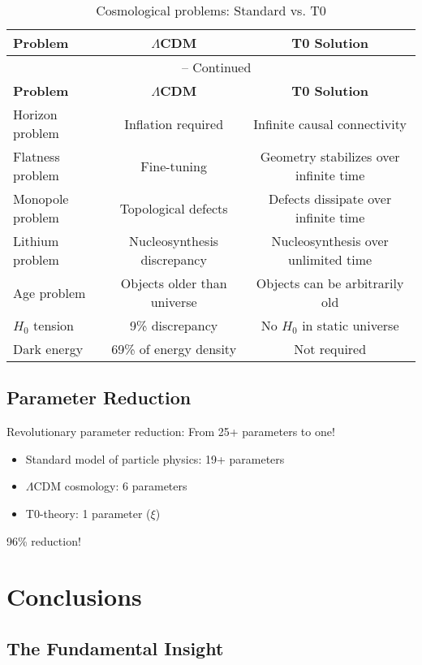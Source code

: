 \documentclass[12pt,a4paper]{article}
\begin{document}
	\begin{longtable}{lcc}
		\caption{Cosmological problems: Standard vs. T0} \\
		\toprule
		\textbf{Problem} & \textbf{$\Lambda$CDM} & \textbf{T0 Solution} \\
		\midrule
		\endfirsthead
		\multicolumn{3}{c}{\tablename\ \thetable{} -- Continued} \\
		\toprule
		\textbf{Problem} & \textbf{$\Lambda$CDM} & \textbf{T0 Solution} \\
		\midrule
		\endhead
		Horizon problem & Inflation required & Infinite causal connectivity \\
		Flatness problem & Fine-tuning & Geometry stabilizes over infinite time \\
		Monopole problem & Topological defects & Defects dissipate over infinite time \\
		Lithium problem & Nucleosynthesis discrepancy & Nucleosynthesis over unlimited time \\
		Age problem & Objects older than universe & Objects can be arbitrarily old \\
		$H_0$ tension & 9\% discrepancy & No $H_0$ in static universe \\
		Dark energy & 69\% of energy density & Not required \\
		\bottomrule
	\end{longtable}
	
	\subsection{Parameter Reduction}
	
	\begin{revolutionary}
		Revolutionary parameter reduction: From 25+ parameters to one!
		\begin{itemize}
			\item Standard model of particle physics: 19+ parameters
			\item $\Lambda$CDM cosmology: 6 parameters
			\item T0-theory: 1 parameter ($\xi$)
		\end{itemize}
		96\% reduction!
	\end{revolutionary}
	
	\section{Conclusions}
	
	\subsection{The Fundamental Insight}
	
\end{document}
